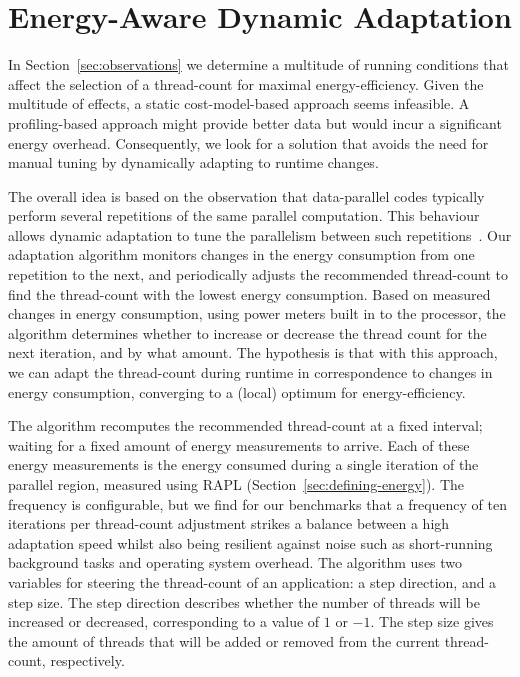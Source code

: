 
\section{Energy-Aware Dynamic Adaptation}\label{sec:implementation}

In Section~\ref{sec:observations} we determine a multitude of running conditions that affect the
selection of a thread-count for maximal energy-efficiency. Given the multitude of effects, a static
cost-model-based approach seems infeasible. A profiling-based approach might provide better data but
would incur a significant energy overhead. Consequently, we look for a solution that avoids the need
for manual tuning by dynamically adapting to runtime changes.

The overall idea is based on the observation that data-parallel codes typically perform several
repetitions of the same parallel computation. This behaviour allows dynamic adaptation to tune the
parallelism between such repetitions~\cite{sac-mtdynamic}. Our adaptation algorithm monitors changes
in the energy consumption from one repetition to the next, and periodically adjusts the recommended
thread-count to find the thread-count with the lowest energy consumption. Based on measured changes
in energy consumption, using power meters built in to the processor, the algorithm determines
whether to increase or decrease the thread count for the next iteration, and by what amount. The
hypothesis is that with this approach, we can adapt the thread-count during runtime in
correspondence to changes in energy consumption, converging to a (local) optimum for
energy-efficiency.

The algorithm recomputes the recommended thread-count at a fixed interval; waiting for a fixed
amount of energy measurements to arrive. Each of these energy measurements is the energy consumed
during a single iteration of the parallel region, measured using RAPL
(Section~\ref{sec:defining-energy}). The frequency is configurable, but we find for our benchmarks
that a frequency of ten iterations per thread-count adjustment strikes a balance between a high
adaptation speed whilst also being resilient against noise such as short-running background tasks
and operating system overhead. The algorithm uses two variables for steering the thread-count of an
application: a step direction, and a step size. The step direction describes whether the number of
threads will be increased or decreased, corresponding to a value of $1$ or $-1$. The step size gives
the amount of threads that will be added or removed from the current thread-count, respectively.

